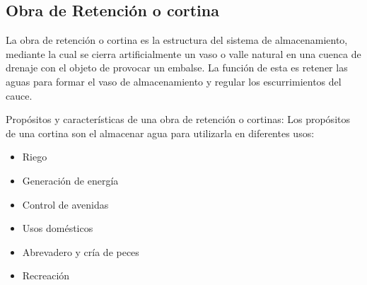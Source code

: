 \subsection{Obra de Retención o cortina}

\begin{definition}
	La obra de retención o cortina es la estructura del sistema de almacenamiento,
	mediante la cual se cierra artificialmente un vaso o valle natural en una cuenca de
	drenaje con el objeto de provocar un embalse. La función de esta es retener las aguas para
	formar el vaso de almacenamiento y regular los escurrimientos del cauce.
\end{definition}

Propósitos y características de una obra de retención o cortinas:
Los propósitos de una cortina son el almacenar agua para utilizarla en diferentes
usos:

\begin{itemize}
	\item  Riego
	\item  Generación de energía
	\item  Control de avenidas
	\item  Usos domésticos
	\item  Abrevadero y cría de peces
	\item  Recreación
\end{itemize}

